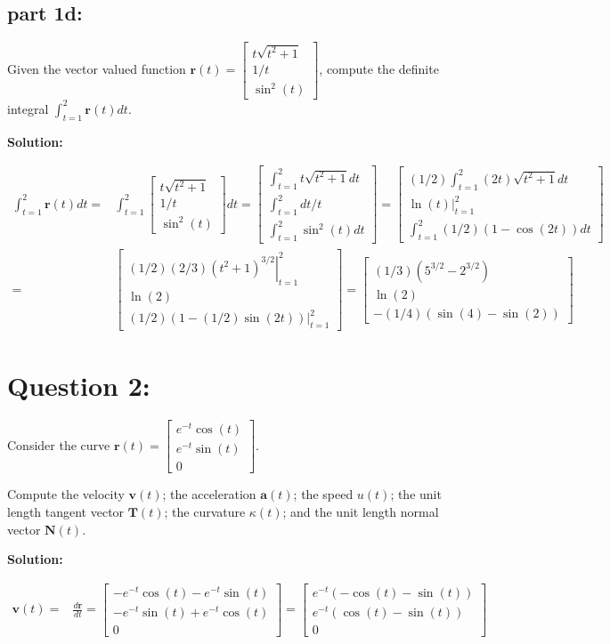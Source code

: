 \documentclass{article}
\newcommand{\colvec}[3]{\begin{bmatrix} #1 \\ #2 \\ #3 \end{bmatrix}}
\newcommand{\at}[1]{\left. #1 \right|}
\newcommand{\dr}[1]{\textcolor{dark_red}{#1}}
\begin{document}
\subsection*{part 1d:}

Given the vector valued function \(\mathbf{r}(t) = \colvec{t\sqrt{t^2 + 1}}{1/t}{\sin^2(t)}\), compute the definite integral \(\int_{t = 1}^2 \mathbf{r}(t)dt\). 

\vspace{0.5cm}

\dr{\bf Solution:}

\vspace{-0.5cm}

\dr{\begin{align*}
\int_{t = 1}^2 \mathbf{r}(t)dt = & \int_{t = 1}^2 \colvec{t\sqrt{t^2 + 1}}{1/t}{\sin^2(t)}dt
= \colvec{\int_{t = 1}^2 t\sqrt{t^2 + 1}dt}{\int_{t = 1}^2 dt/t}{\int_{t = 1}^2 \sin^2(t)dt} 
= \colvec{(1/2)\int_{t = 1}^2 (2t)\sqrt{t^2 + 1}dt}{\at{\ln(t)}_{t=1}^2}{\int_{t = 1}^2 (1/2)(1 - \cos(2t))dt} \\
= & \colvec{(1/2)\at{(2/3)(t^2 + 1)^{3/2}}_{t=1}^2}{\ln(2)}{\at{(1/2)(1 - (1/2)\sin(2t))}_{t=1}^2}  
= \colvec{(1/3)(5^{3/2} - 2^{3/2})}{\ln(2)}{-(1/4)(\sin(4) - \sin(2))}
\end{align*}}




\section*{Question 2:}

Consider the curve \(\mathbf{r}(t) = \colvec{e^{-t}\cos(t)}{e^{-t}\sin(t)}{0}\).

Compute the velocity \(\mathbf{v}(t)\); the acceleration \(\mathbf{a}(t)\); the speed \(u(t)\); the unit length tangent vector \(\mathbf{T}(t)\); the curvature \(\kappa(t)\); and the unit length normal vector \(\mathbf{N}(t)\).

\vspace{0.5cm}

\dr{\bf Solution:}

\vspace{0.5cm}

\dr{\begin{align*}
\mathbf{v}(t) = & \frac{d\mathbf{r}}{dt} 
= \colvec{-e^{-t}\cos(t) - e^{-t}\sin(t)}{-e^{-t}\sin(t) + e^{-t}\cos(t)}{0} 
= \colvec{e^{-t}(-\cos(t) - \sin(t))}{e^{-t}(\cos(t) - \sin(t))}{0}
\end{align*}} 
 
\end{document}

